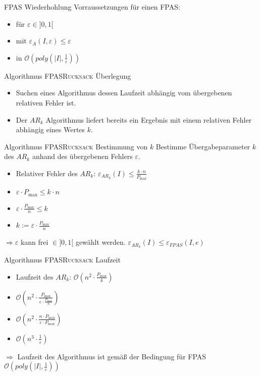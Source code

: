 \begin{frame}{FPAS Wiederhohlung}
	Vorraussetzungen für einen FPAS:
	\begin{itemize}
		\item für $\varepsilon \in ]0, 1[$ 
		\item mit $\varepsilon_A(I,\varepsilon) \le \varepsilon$
		\item in $\displaystyle \mathcal O(poly(\vert I \vert, \frac{1}{\varepsilon}))$
	\end{itemize}
\end{frame}

\begin{frame}{Algorithmus \textsc{FPASRucksack} Überlegung}
	\begin{itemize}
		\item
		Suchen eines Algorithmus dessen Laufzeit abhängig vom übergebenen relativen Fehler ist.
		\item
		Der $AR_k$ Algorithmus liefert bereits ein Ergebnis mit einem relativen Fehler abhängig eines Wertes $k$.
	\end{itemize}
\end{frame}

\begin{frame}{Algorithmus \textsc{FPASRucksack} Bestimmung von $k$}
	Bestimme Übergabeparameter $k$ des $AR_k$ anhand des übergebenen Fehlers $\varepsilon$.
	\begin{itemize}
		\item
		Relativer Fehler des $AR_k$: $\displaystyle \varepsilon_{AR_k}(I) \le \frac{k \cdot n}{P_{\max}}$
		\pause
		\item[]
		$\displaystyle \varepsilon \cdot P_{\max} \le k \cdot n$
		\item[]
		$\displaystyle \varepsilon \cdot \frac{P_{\max}}{n} \le k$
		\item[]
		$\displaystyle k := \varepsilon \cdot \frac{P_{\max}}{n}$
	\end{itemize}

$\Rightarrow \varepsilon$ kann frei $\in]0,1[$ gewählt werden. $\varepsilon_{AR_k}(I) \le \varepsilon_{FPAS}(I,e)$

\end{frame}
\begin{frame}{Algorithmus \textsc{FPASRucksack} Laufzeit}
	\begin{itemize}
		\item
		Laufzeit des $AR_k$: $\displaystyle \mathcal O(n^2 \cdot \frac{P_{\max}}{k})$
		\pause
		\item[]
		$\displaystyle \mathcal O(n^2 \cdot \frac{P_{\max}}{\varepsilon \cdot \frac{P_{\max}}{n}})$
		\item[]
		$\displaystyle \mathcal O(n^2 \cdot \frac{n \cdot P_{\max}}{\varepsilon \cdot P_{\max}})$
		\item[]
		$\displaystyle \mathcal O(n^3 \cdot \frac{1}{\varepsilon})$
	\end{itemize}
$\Rightarrow$ Laufzeit des Algorithmus ist gemäß der Bedingung für FPAS $\displaystyle \mathcal O(poly(\vert I \vert, \frac{1}{\varepsilon}))$
\end{frame}